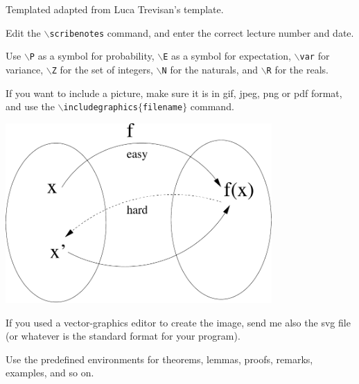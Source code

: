






Templated adapted from Luca Trevisan's template.

Edit the {\tt $\backslash$scribenotes} command, and enter the correct
lecture number and date.

Use {\tt $\backslash$P} as a symbol for probability,
{\tt $\backslash$E} as a symbol for expectation,
{\tt $\backslash$var} for variance,
{\tt $\backslash$Z} for the set of integers, 
{\tt $\backslash$N} for the naturals,
and {\tt $\backslash$R} for the reals.

If you want to include a picture, make sure it is in gif, jpeg, png
or pdf format, and use the {\tt $\backslash$includegraphics$\{$filename$\}$}
command.

\includegraphics[width=4in]{fig1.pdf}

If you used a vector-graphics editor to create the image, send me also
the svg file (or whatever is the standard format for your program).

Use the predefined environments for theorems, lemmas, proofs, remarks, examples, 
and so on.


